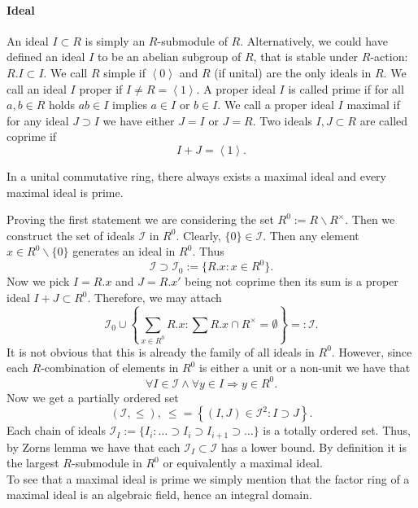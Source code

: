 \paragraph{Ideal}
An ideal $I \subset R$ is simply an $R$-submodule of $R$. Alternatively, we could have defined an ideal $I$ to be an abelian subgroup of $R$, that is stable under $R$-action: $R.I \subset I$. We call $R$ simple if $\left<0\right>$ and $R$ (if unital) are the only ideals in $R$. We call an ideal $I$ proper if $I \neq R = \left<1\right>$. A proper ideal $I$ is called prime if for all $a, b \in R$ holds $a b \in I$ implies $a \in I$ or $b \in I$. We call a proper ideal $I$ maximal if for any ideal $J \supset I$  we have either $J = I$ or $J = R$. Two ideals $I, J \subset R$ are called coprime if
$$I + J = \left<1\right>.$$
\begin{prop}
In a unital commutative ring, there always exists a maximal ideal and every maximal ideal is prime.
\end{prop}
\bws Proving the first statement we are considering the set $R^0 := R\backslash R^\times$. Then we construct the set of ideals $\mathcal{I}$ in $R^0$. Clearly, $\{0\} \in \mathcal{I}$. Then any element $x \in R^0 \backslash \{0\}$ generates an ideal in $R^0$. Thus
$$\mathcal{I} \supset \mathcal{I}_0 := \{R.x : x \in R^0\}.$$
Now we pick $I = R.x$ and $J = R.x'$ being not coprime then its sum is a proper ideal $I + J \subset R^0$. Therefore, we may attach
$$\mathcal{I}_0 \cup \left\{\sum_{x \in R^0} R.x : \sum R.x \cap R^\times = \emptyset\right\} =: \mathcal{I}.$$
It is not obvious that this is already the family of all ideals in $R^0$. However, since each $R$-combination of elements in $R^0$ is either a unit or a non-unit we have that
$$\forall I \in \mathcal{I} \wedge \forall y \in I \Rightarrow y \in R^0.$$
Now we get a partially ordered set
$$(\mathcal{I}, \leq),\ \leq = \left\{(I,J) \in \mathcal{I}^2 : I \supset J\right\}.$$
Each chain of ideals $\mathcal{I}_I := \{I_i : \ldots \supset I_i \supset I_{i+1} \supset \ldots\}$ is a totally ordered set. Thus, by Zorns lemma we have that each $\mathcal{I}_I \subset \mathcal{I}$ has a lower bound. By definition it is the largest $R$-submodule in $R^0$ or equivalently a maximal ideal.\\
\indent To see that a maximal ideal is prime we simply mention that the factor ring of a maximal ideal is an algebraic field, hence an integral domain.
